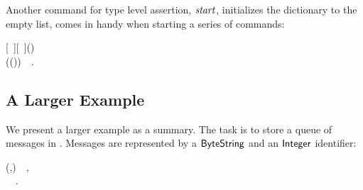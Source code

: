 
Another command for type level assertion, \ensuremath{\Varid{start}}, initializes the dictionary to
 the empty list, comes in handy when starting a series of \Edis{} commands:

\begin{hscode}\SaveRestoreHook
{}%
%
\>[B]{}\mathbin{::}\;\mbox{\textquotesingle}[~]\;\mbox{\textquotesingle}[~]\;(){}\<[E]%
\\
\>[B]{}\mathrel{=}\;(\;())~~.{}\<[E]%
\ColumnHook
\end{hscode}\resethooks

\subsection{A Larger Example}

We present a larger example as a summary. The task is to store a queue of
messages in \Redis{}. Messages are represented by a \ensuremath{\Conid{ByteString}} and an
\ensuremath{\Conid{Integer}} identifier:
\begin{hscode}\SaveRestoreHook
{}%
%
%
\>[B]{}\;\mathrel{=}\;\;\;\;(,)~~,{}\<[E]%
\\
\>[B]{}\;\;\;\;{}\<[35]%
\>[35]{}~~.{}\<[E]%
\ColumnHook
\end{hscode}\resethooks

